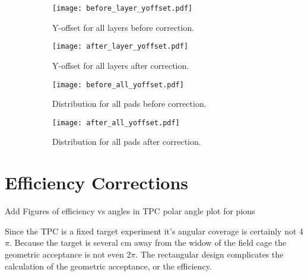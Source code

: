 \begin{figure}[!htb]
    \centering
    \begin{subfigure}[t]{0.49\textwidth}
        \centering
        \texttt{[image: before\_layer\_yoffset.pdf]}
        \caption{Y-offset for all layers before correction.} \label{fig:yoff_beforeLayer}
    \end{subfigure}
    \hfill
    \begin{subfigure}[t]{.49\textwidth}
        \centering
        \texttt{[image: after\_layer\_yoffset.pdf]} 
        \caption{Y-offset for all layers after correction.} \label{fig:yoff_afterLayer}
    \end{subfigure}
     \hfill
    \begin{subfigure}[t]{.49\textwidth}
        \centering
        \texttt{[image: before\_all\_yoffset.pdf]} 
        \caption{Distribution for all pads before correction.} \label{fig:yoff_allBefore}
    \end{subfigure}
    \hfill
    \begin{subfigure}[t]{.49\textwidth}
        \centering
        \texttt{[image: after\_all\_yoffset.pdf]} 
        \caption{Distribution for all pads after correction.} \label{fig:yoff_allAfter}
    \end{subfigure}
    \caption{ }
\label{fig:yoff}
\end{figure}



\section{Efficiency Corrections}
Add Figures of efficiency vs angles in TPC polar angle plot for pions


Since the \spirit TPC is a fixed target experiment it's angular coverage is certainly not 4$\pi$. Because the target is several cm away from the widow of the field cage the geometric acceptance is not even 2$\pi$. The rectangular design complicates the calculation of the geometric acceptance, or the efficiency.



